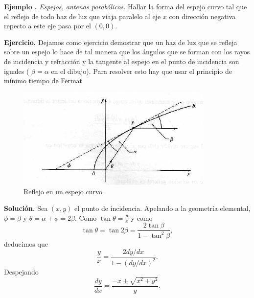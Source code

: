 \documentclass{article}
\newcounter{ejemplo_cont}
\newenvironment{ejemplo}{\noindent\textbf{Ejemplo  \arabic{ejemplo_cont}.} }{\addtocounter{ejemplo_cont}{1}}
\begin{document}
\begin{ejemplo} \textit{Espejos, antenas parabólicos.} Hallar la forma del espejo curvo tal que el reflejo de todo haz de luz que viaja paralelo al eje $x$ con dirección
negativa repecto a este eje pasa por el $(0,0)$.
\end{ejemplo}

\noindent\textbf{Ejercicio.} Dejamos como ejercicio demostrar que un haz de luz que se refleja sobre un espejo lo hace de tal manera que los ángulos que se forman con los rayos
de incidencia y refracción y la tangente al espejo en el punto de incidencia son iguales ( $\beta=\alpha$ en el dibujo). Para resolver esto hay que usar el principio
de mínimo tiempo de Fermat
\begin{figure}
 \begin{center}
 \includegraphics[scale=.4]{imagenes/espejo.png}
\end{center}
\caption{Reflejo en un espejo curvo}
\end{figure}
 \textbf{Solución.} Sea $(x,y)$ el punto de incidencia. Apelando a la geometría elemental, $\phi=\beta$ y $\theta=\alpha+\phi=2\beta$. Como $\tan\theta=\frac{y}{x}$
  y como
  \[\tan\theta =\tan 2\beta=\frac{2\tan\beta}{1-\tan^2\beta},\]
deducimos que
\[\frac{y}{x}=\frac{2 dy/dx}{1-(dy/dx)^2}.\]
Despejando
\[\frac{dy}{dx} =\frac{-x\pm\sqrt{x^2+y^2}}{y}.\]
\end{document}
